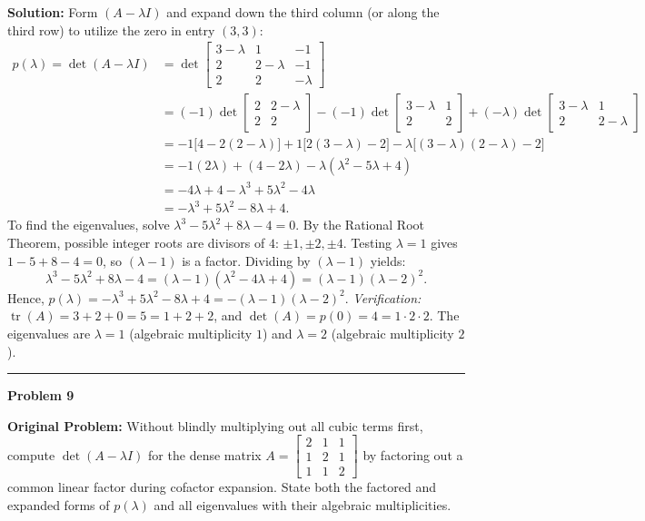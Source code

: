 \documentclass[11pt, letterpaper]{article}
\theoremstyle{definition}
\theoremstyle{remark}
\begin{document}
\textbf{Solution:} Form $(A - \lambda I)$ and expand down the third column (or along the third row) to utilize the zero in entry $(3, 3)$:
\begin{align*}
p(\lambda) = \det(A - \lambda I) &= \det\begin{bmatrix} 3 - \lambda & 1 & -1 \\ 2 & 2 - \lambda & -1 \\ 2 & 2 & -\lambda \end{bmatrix} \\
&= (-1)\det\begin{bmatrix} 2 & 2 - \lambda \\ 2 & 2 \end{bmatrix} - (-1)\det\begin{bmatrix} 3 - \lambda & 1 \\ 2 & 2 \end{bmatrix} + (-\lambda)\det\begin{bmatrix} 3 - \lambda & 1 \\ 2 & 2 - \lambda \end{bmatrix} \\
&= -1\big[4 - 2(2 - \lambda)\big] + 1\big[2(3 - \lambda) - 2\big] - \lambda\big[(3 - \lambda)(2 - \lambda) - 2\big] \\
&= -1(2\lambda) + (4 - 2\lambda) - \lambda(\lambda^2 - 5\lambda + 4) \\
&= -4\lambda + 4 - \lambda^3 + 5\lambda^2 - 4\lambda \\
&= -\lambda^3 + 5\lambda^2 - 8\lambda + 4.
\end{align*}
To find the eigenvalues, solve $\lambda^3 - 5\lambda^2 + 8\lambda - 4 = 0$. By the Rational Root Theorem, possible integer roots are divisors of $4$: $\pm 1, \pm 2, \pm 4$. Testing $\lambda = 1$ gives $1 - 5 + 8 - 4 = 0$, so $(\lambda - 1)$ is a factor. Dividing by $(\lambda - 1)$ yields:
\[
\lambda^3 - 5\lambda^2 + 8\lambda - 4 = (\lambda - 1)(\lambda^2 - 4\lambda + 4) = (\lambda - 1)(\lambda - 2)^2.
\]
Hence, $p(\lambda) = -\lambda^3 + 5\lambda^2 - 8\lambda + 4 = -(\lambda - 1)(\lambda - 2)^2$.
\textit{Verification:} $\operatorname{tr}(A) = 3 + 2 + 0 = 5 = 1 + 2 + 2$, and $\det(A) = p(0) = 4 = 1 \cdot 2 \cdot 2$.
The eigenvalues are $\lambda = 1$ (algebraic multiplicity $1$) and $\lambda = 2$ (algebraic multiplicity $2$).

\noindent\rule{\textwidth}{0.4pt}

\noindent\textbf{Problem 9}

\textbf{Original Problem:} Without blindly multiplying out all cubic terms first, compute $\det(A - \lambda I)$ for the dense matrix $A = \begin{bmatrix} 2 & 1 & 1 \\ 1 & 2 & 1 \\ 1 & 1 & 2 \end{bmatrix}$ by factoring out a common linear factor during cofactor expansion. State both the factored and expanded forms of $p(\lambda)$ and all eigenvalues with their algebraic multiplicities.
\end{document}
